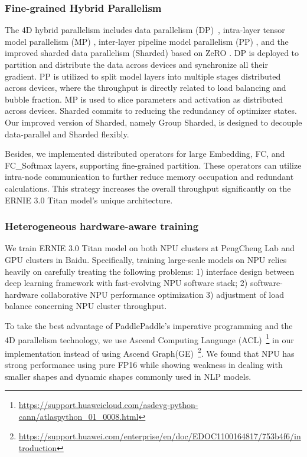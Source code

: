 \subsubsection{Fine-grained Hybrid Parallelism} The 4D hybrid parallelism includes data parallelism (DP)~\cite{horovod, liPyTorchDistributedExperiences2020a}, intra-layer tensor model parallelism (MP) \cite{tensorflowmesh, megatron}, inter-layer pipeline model parallelism (PP) \cite{huangGPipeEfficientTraining2019, pipedream, pipedream2bw, narayananMemoryEfficientPipelineParallelDNN2021, liTeraPipeTokenLevelPipeline2021}, and the improved sharded data parallelism (Sharded) based on ZeRO \cite{rajbhandariZeROMemoryOptimizations2020}. DP is deployed to partition and distribute the data across devices and synchronize all their gradient. PP is utilized to split model layers into multiple stages distributed across devices, where the throughput is directly related to load balancing and bubble fraction. MP is used to slice parameters and activation as distributed across devices. Sharded commits to reducing the redundancy of optimizer states. Our improved version of Sharded, namely Group Sharded, is designed to decouple data-parallel and Sharded flexibly.

Besides, we implemented distributed operators for large Embedding, FC, and  FC\_Softmax layers, supporting fine-grained partition. These operators can utilize intra-node communication to further reduce memory occupation and redundant calculations. This strategy increases the overall throughput significantly on the ERNIE 3.0 Titan model's unique architecture.

\subsubsection{Heterogeneous hardware-aware training} We train ERNIE 3.0 Titan model on both NPU clusters at PengCheng Lab and GPU clusters in Baidu. Specifically, training large-scale models on NPU relies heavily on carefully treating the following problems: 1) interface design between deep learning framework with fast-evolving NPU software stack; 2) software-hardware collaborative NPU performance optimization 3) adjustment of load balance concerning NPU cluster throughput. 

To take the best advantage of PaddlePaddle's imperative programming and the 4D parallelism technology, we use Ascend Computing Language (ACL)~\footnote{\url{https://support.huaweicloud.com/asdevg-python-cann/atlaspython_01_0008.html}} in our implementation instead of using Ascend Graph(GE)~\footnote{\url{https://support.huawei.com/enterprise/en/doc/EDOC1100164817/753b4f6/introduction}}. We found that NPU has strong performance using pure FP16 while showing weakness in dealing with smaller shapes and dynamic shapes commonly used in NLP models.

